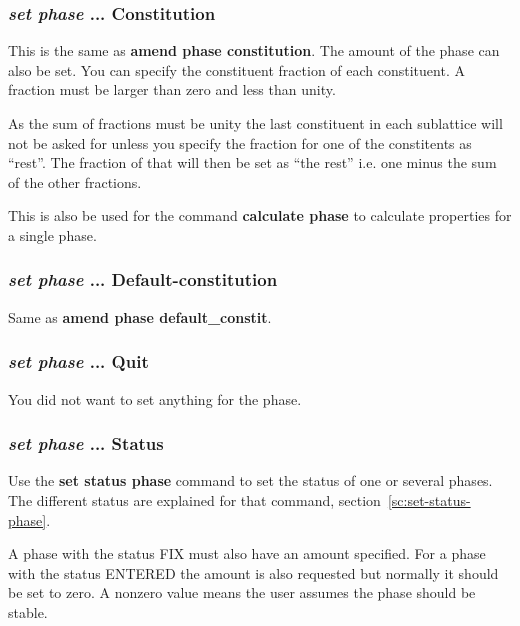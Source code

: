 \documentclass[11pt]{article}
\begin{document}
\subsubsection{{\em set phase} ... Constitution}
\hypertarget{Amend phase constit}{}
\hypertarget{Set phase constitution}{}

This is the same as {\bf amend phase constitution}.  The amount of the
phase can also be set.  You can specify the constituent fraction of
each constituent.  A fraction must be larger than zero and less than
unity.

As the sum of fractions must be unity the last constituent in each
sublattice will not be asked for unless you specify the fraction for
one of the constitents as ``rest''.  The fraction of that will then be
set as ``the rest'' i.e. one minus the sum of the other fractions.

This is also be used for the command {\bf
  calculate phase} to calculate properties for a single phase.

\hypertarget{Set phase ... default-constitu}{}
\subsubsection{{\em set phase} ... Default-constitution}

Same as {\bf amend phase default\_constit}.

\hypertarget{Set phase ... quit}{}
\subsubsection{{\em set phase} ... Quit}

You did not want to set anything for the phase.

\hypertarget{Set phase status}{}
\subsubsection{{\em set phase} ... Status}\label{sc:setphstat}

Use the {\bf set status phase} command to set the status of one or several
phases.  The different status are explained for that command,
section~\ref{sc:set-status-phase}.

A phase with the status FIX must also have an amount specified.  For a
phase with the status ENTERED the amount is also requested but
normally it should be set to zero.  A nonzero value means the user
assumes the phase should be stable.
\end{document}
